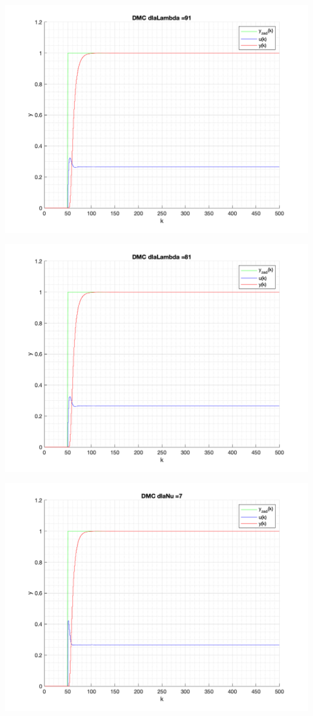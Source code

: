 \documentclass[a4paper, 11pt]{article}
\begin{document}
\begin{enumerate}
 \includegraphics[width=\linewidth]{./ModelsP4_Lambda/P4_DMC_Lambda_91_png.png} 
 
 \includegraphics[width=\linewidth]{./ModelsP4_Lambda/P4_DMC_Lambda_81_png.png} 
 
 \includegraphics[width=\linewidth]{./ModelsP4_Nu/P4_DMC_Nu_7_png.png} 
 

\end{enumerate}
\end{document}
